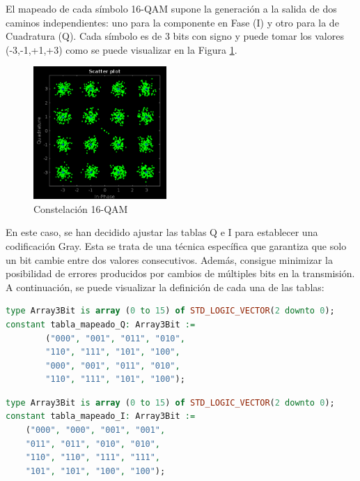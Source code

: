 El mapeado de cada símbolo 16-QAM supone la generación a la salida de dos caminos independientes: uno para la componente en Fase (I) y otro para la de Cuadratura (Q). Cada símbolo es de 3 bits con signo y puede tomar los valores (-3,-1,+1,+3) como se puede visualizar en la Figura \ref{fig:qam}.

\vspace{3mm}

\begin{figure}[h]
	\centering
	\includegraphics[width=0.45\textwidth]{img/matlab/qam.PNG}
	\caption{Constelación 16-QAM}
	\label{fig:qam}
\end{figure}
    
\vspace{3mm}

En este caso, se han decidido ajustar las tablas Q e I para establecer una codificación Gray. Esta se trata de una técnica específica que garantiza que solo un bit cambie entre dos valores consecutivos. Además, consigue minimizar la posibilidad de errores producidos por cambios de múltiples bits en la transmisión. A continuación, se puede visualizar la definición de cada una de las tablas:

\vspace{5mm}

\begin{lstlisting}[language=VHDL, style=mystyle, caption={Definición de la tabla de mapeado Q}]
type Array3Bit is array (0 to 15) of STD_LOGIC_VECTOR(2 downto 0);
constant tabla_mapeado_Q: Array3Bit :=
		("000", "001", "011", "010", 
		"110", "111", "101", "100",
		"000", "001", "011", "010", 
		"110", "111", "101", "100");
\end{lstlisting}

\pagebreak

\begin{lstlisting}[language=VHDL, style=mystyle, caption={Definición de la tabla de mapeado I}]
type Array3Bit is array (0 to 15) of STD_LOGIC_VECTOR(2 downto 0);
constant tabla_mapeado_I: Array3Bit := 
	("000", "000", "001", "001", 
	"011", "011", "010", "010",
	"110", "110", "111", "111", 
	"101", "101", "100", "100");
\end{lstlisting}

